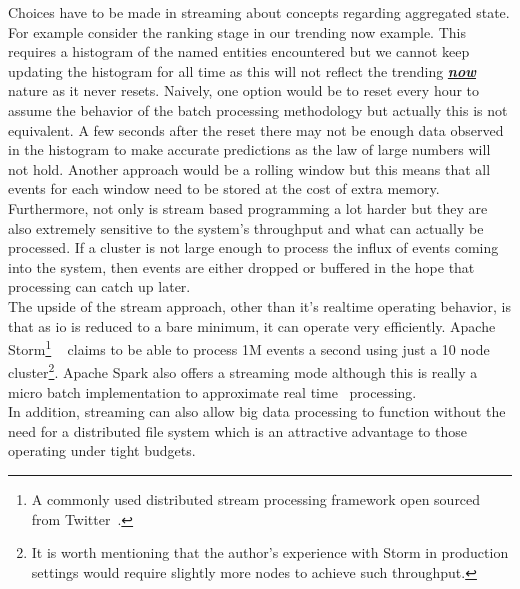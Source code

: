 \documentclass[a4paper,11pt]{scrreprt}
\begin{document}
Choices have to be made in streaming about concepts regarding aggregated state. For example consider the ranking stage in our trending now example. This requires a histogram of the named entities encountered but we cannot keep updating the histogram for all time as this will not reflect the trending \textbf{\textit{\underline{now}}} nature as it never resets. Naively, one option would be to reset every hour to assume the behavior of the batch processing methodology but actually this is not equivalent. A few seconds after the reset there may not be enough data observed in the histogram to make accurate predictions as the law of large numbers will not hold. Another approach would be a rolling window but this means that all events for each window need to be stored at the cost of extra memory. Furthermore, not only is stream based programming a lot harder but they are also extremely sensitive to the system's throughput and what can actually be processed. If a cluster is not large enough to process the influx of events coming into the system, then events are either dropped or buffered in the hope that processing can catch up later.\\
The upside of the stream approach, other than it's realtime operating behavior, is that as \acrshort{io} is reduced to a bare minimum, it can operate very efficiently. Apache Storm\footnote{A commonly used distributed stream processing framework open sourced from Twitter~\cite{storm-twitter}.} ~\cite{storm-site} claims to be able to process 1M events a second using just a 10 node cluster\footnote{It is worth mentioning that the author's experience with Storm in production settings would require slightly more nodes to achieve such throughput.}. Apache Spark also offers a streaming mode although this is really a micro batch implementation to approximate real time~\cite{spark-streaming-paper} processing. \\
In addition, streaming can also allow big data processing to function without the need for a distributed file system which is an attractive advantage to those operating under tight budgets. 
\end{document}
